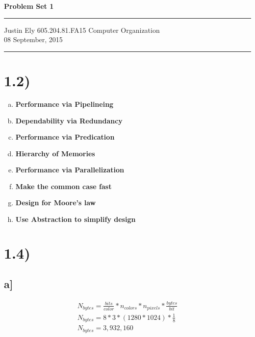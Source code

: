 \documentclass[a4paper,11pt]{article}
\begin{document}
\begin{flushright}

\vspace{1.1cm}

{\bf\Huge Problem Set 1}

\rule{0.25\linewidth}{0.5pt}

\vspace{0.5cm}
Justin Ely
\linebreak
\newline
\footnotesize{605.204.81.FA15 Computer Organization\\}
\vspace{0.5cm}
08 September, 2015
\end{flushright}

\noindent\rule{\linewidth}{1.0pt}


\section*{1.2)}

 \begin{enumerate}[(a)]
   \item {\bf Performance via Pipelineing}
   \item {\bf Dependability via Redundancy}
   \item {\bf Performance via Predication}
   \item {\bf Hierarchy of Memories}
   \item {\bf Performance via Parallelization} 
   \item {\bf Make the common case fast}
   \item {\bf Design for Moore's law}
   \item {\bf Use Abstraction to simplify design}
 \end{enumerate}


\section*{1.4)} 

\subsection*{a]}

\begin{eqnarray}
   N_{bytes} = \frac{bits}{color} * n_{colors} *  n_{pixels} * \frac{bytes}{bit} \\
   N_{bytes} = 8 * 3 * (1280 * 1024) * \frac{1}{8} \\
   N_{bytes} = 3,932,160
\end{eqnarray}
\end{document}
